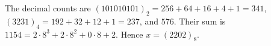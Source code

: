 The decimal counts are $(101010101)_2=256+64+16+4+1=341$, $(3231)_4=192+32+12+1=237$, and $576$. Their sum is $1154=2\cdot8^3+2\cdot8^2+0\cdot8+2$. Hence $\boxed{x=(2202)_8}$.
